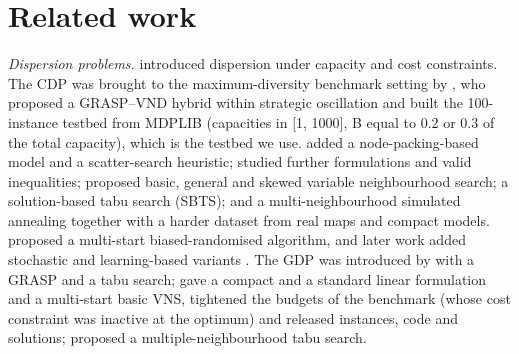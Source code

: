 \section{Related work}\label{sec:related_work}

\emph{Dispersion problems.} \citet{rosenkrantz2000} introduced dispersion under capacity and cost constraints. The CDP was brought to the maximum-diversity benchmark setting by \citet{peiro2021}, who proposed a GRASP--VND hybrid within strategic oscillation and built the 100-instance testbed from MDPLIB (capacities in [1, 1000], B equal to 0.2 or 0.3 of the total capacity), which is the testbed we use. \citet{marti2021b} added a node-packing-based model and a scatter-search heuristic; \citet{landete2023} studied further formulations and valid inequalities; \citet{mladenovic2022b} proposed basic, general and skewed variable neighbourhood search; \citet{lu2023} a solution-based tabu search (SBTS); and \citet{rosati2024} a multi-neighbourhood simulated annealing together with a harder dataset from real maps and compact models. \citet{gomez2022} proposed a multi-start biased-randomised algorithm, and later work added stochastic and learning-based variants \citep{gomez2023,ghorbani2024}. The GDP was introduced by \citet{martinezgavara2021} with a GRASP and a tabu search; \citet{lozanoosorio2022} gave a compact and a standard linear formulation and a multi-start basic VNS, tightened the budgets of the benchmark (whose cost constraint was inactive at the optimum) and released instances, code and solutions; \citet{mladenovic2022a} proposed a multiple-neighbourhood tabu search.

